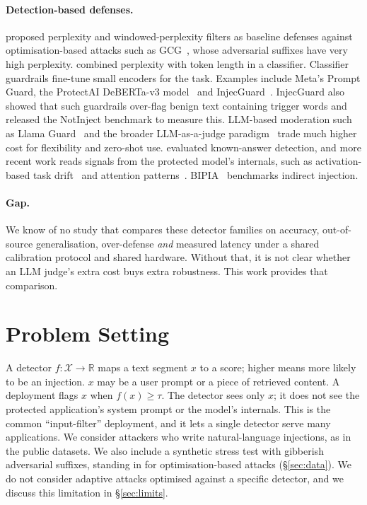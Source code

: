 \documentclass[11pt]{article}
\begin{document}
\paragraph{Detection-based defenses.}
\citet{jain2023baseline} proposed perplexity and windowed-perplexity filters as baseline
defenses against optimisation-based attacks such as GCG~\citep{zou2023universal}, whose
adversarial suffixes have very high perplexity. \citet{alon2023detecting} combined
perplexity with token length in a classifier. Classifier guardrails fine-tune small
encoders for the task. Examples include Meta's Prompt Guard, the ProtectAI DeBERTa-v3
model~\citep{protectai2024deberta} and InjecGuard~\citep{li2024injecguard}. InjecGuard
also showed that such guardrails over-flag benign text containing trigger words and
released the NotInject benchmark to measure this. LLM-based moderation such as Llama
Guard~\citep{inan2023llamaguard} and the broader LLM-as-a-judge
paradigm~\citep{zheng2023judging} trade much higher cost for flexibility and
zero-shot use. \citet{liu2024formalizing} evaluated known-answer detection, and more
recent work reads signals from the protected model's internals, such as activation-based
task drift~\citep{abdelnabi2024track} and attention patterns~\citep{hung2024attention}.
BIPIA~\citep{yi2023benchmarking} benchmarks indirect injection.

\paragraph{Gap.}
We know of no study that compares these detector families on accuracy, out-of-source
generalisation, over-defense \emph{and} measured latency under a shared calibration
protocol and shared hardware. Without that, it is not clear whether an LLM judge's extra
cost buys extra robustness. This work provides that comparison.

\section{Problem Setting}
\label{sec:setting}

A detector $f:\mathcal{X}\to\mathbb{R}$ maps a text segment $x$ to a score; higher means
more likely to be an injection. $x$ may be a user prompt or a piece of retrieved content.
A deployment flags $x$ when $f(x)\ge\tau$. The detector sees only $x$; it does not see the
protected application's system prompt or the model's internals. This is the common
``input-filter'' deployment, and it lets a single detector serve many applications. We
consider attackers who write natural-language injections, as in the public datasets. We
also include a synthetic stress test with gibberish adversarial suffixes, standing in
for optimisation-based attacks (\S\ref{sec:data}). We do not consider adaptive attacks
optimised against a specific detector, and we discuss this limitation in \S\ref{sec:limits}.
\end{document}
